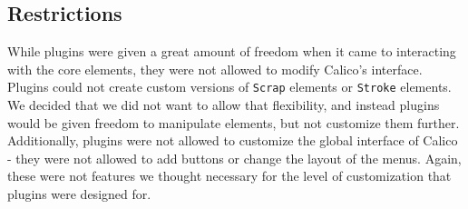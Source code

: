 \subsection*{Restrictions}
While plugins were given a great amount of freedom when it came to interacting with the core elements, they were not allowed to modify Calico's interface. Plugins could not create custom versions of \texttt{Scrap} elements or \texttt{Stroke} elements. We decided that we did not want to allow that flexibility, and instead plugins would be given freedom to manipulate elements, but not customize them further. Additionally, plugins were not allowed to customize the global interface of Calico - they were not allowed to add buttons or change the layout of the menus. Again, these were not features we thought necessary for the level of customization that plugins were designed for.